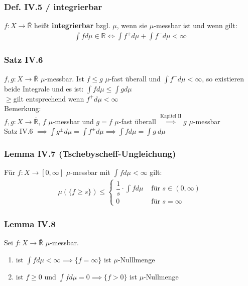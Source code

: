 \begin{frame}
\frametitle{Def. IV.5 / integrierbar}
$f:X \to \bar{\mathbb{R}}$ heißt \textbf{integrierbar} bzgl. $\mu$, wenn sie $\mu$-messbar ist und wenn gilt:
    \begin{align*}
      \int f d\mu \in \mathbb{R} \Leftrightarrow \int f^+ d\mu + \int f^- d\mu < \infty
    \end{align*}
\end{frame}


\begin{frame}
\frametitle{Satz IV.6}
$f,g:X \to \bar{\mathbb{R}}$ $\mu$-messbar. Ist $f \leq g$ $\mu$-fast überall und $\int f^- d\mu < \infty$, so existieren beide Integrale und es ist: $\int f d\mu \leq \int g d\mu$\\
    \glqq$\geq$\grqq gilt entsprechend wenn $f^+ d\mu < \infty$\\
\medskip
Bemerkung:\\
$f,g: X \to \bar{\mathbb{R}}$, $f$ $\mu$-messbar und $g = f$ $\mu$-fast überall $\stackrel{\text{Kapitel II}}{\implies} g$ $\mu$-messbar\\
    Satz IV.6 $\implies \int g^{\pm} d\mu = \int f^{\pm} d\mu \implies \int f d\mu = \int g \ d\mu$
\end{frame}


\begin{frame}
\frametitle{Lemma IV.7 (Tschebyscheff-Ungleichung)}
Für $f:X \to [0, \infty]$ $\mu$-messbar mit $\int f d\mu < \infty$ gilt:
    \begin{align*}
      \mu(\{f\geq s\}) \leq \begin{cases}
        \dfrac{1}{s} \cdot \int f d\mu & \text{ für } s \in (0, \infty)\\
        0 & \text{ für } s = \infty
      \end{cases}
    \end{align*}
\end{frame}


\begin{frame}
\frametitle{Lemma IV.8}
Sei $f: X \to \bar{\mathbb{R}}$ $\mu$-messbar.
    \begin{enumerate}[label=\roman*)]
      \item ist $\int f d\mu < \infty \implies \{f = \infty\}$ ist $\mu$-Nulllmenge
      \item ist $f \geq 0$ und $\int f d\mu = 0 \implies \{f > 0\}$ ist $\mu$-Nullmenge
    \end{enumerate}
\end{frame}


